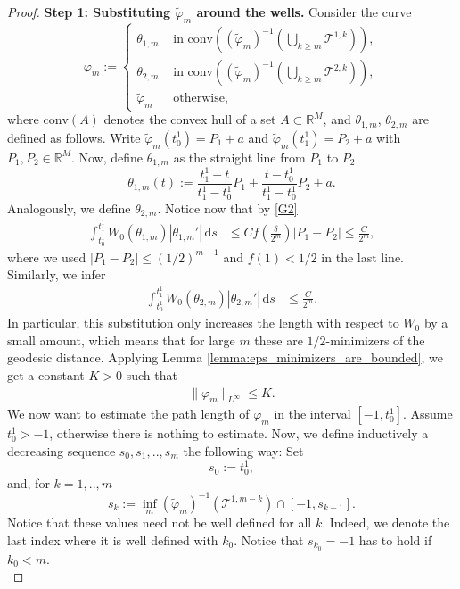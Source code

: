 \documentclass[a4paper, 11pt, reqno]{amsart}
\theoremstyle{plain}
\theoremstyle{definition}
\theoremstyle{remark}
\newcommand{\R}{\mathbb R}
\newcommand{\T}{\mathcal T}
\begin{document}
\begin{proof}
    \textbf{Step 1: Substituting $\tilde \varphi_m$ around the wells.} Consider the curve 
    \[
        \varphi_m := \begin{cases}
            \theta_{1,m} & \text{ in } \text{conv}\left((\tilde \varphi_m)^{-1}(\bigcup_{k \geq m}\T^{1,k})\right), \\
            \theta_{2,m} & \text{ in } \text{conv}\left((\tilde \varphi_m)^{-1}(\bigcup_{k \geq m}\T^{2,k})\right), \\
            \tilde \varphi_m & \text{ otherwise},
        \end{cases}
    \]
    where $\text{conv}(A)$ denotes the convex hull of a set $A \subset \R^M$, and $\theta_{1,m}$, $\theta_{2,m}$ are defined as follows.
    Write $\tilde \varphi_m(t_0^1) = P_1 + a$ and $\tilde \varphi_m(t_1^1) = P_2 + a$ with $P_1, P_2 \in \R^M$. Now, define $\theta_{1,m}$ as the straight line from $P_1$ to $P_2$
    \[
        \theta_{1,m}(t) := \frac{t_1^1 - t}{t_1^1 - t_0^1}P_1 + \frac{t - t_0^1}{t_1^1 - t_0^1}P_2 + a.
    \]
    Analogously, we define $\theta_{2,m}$.
    Notice now that by \ref{G2}
    \begin{align*}
        \int_{t_0^1}^{t_1^1} {W_0(\theta_{1,m})}|\theta_{1,m}'| \,\mathrm{d}s &\leq Cf\left( \frac{\delta}{2^m} \right)|P_1 - P_2|
        \leq \frac{C}{2^m},
    \end{align*}
    where we used $|P_1 - P_2| \leq (1/2)^{m-1}$ and $f(1) < 1/2$ in the last line. Similarly, we infer 
    \begin{align*}
        \int_{t_0^1}^{t_1^1} {W_0(\theta_{2,m})}|\theta_{2,m}'| \,\mathrm{d}s &\leq \frac{C}{2^m}.
    \end{align*}
    In particular, this substitution only increases the length with respect to $W_0$ by a small amount, which means that for large $m$ these are $1/2$-minimizers of the geodesic distance. Applying Lemma \ref{lemma:eps_minimizers_are_bounded}, we get a constant $K > 0$  such that 
    \begin{align}\label{eq:uniform_estimate_sequence}
        \|\varphi_m\|_{L^\infty} \leq K.
    \end{align}
    We now want to estimate the path length of $\varphi_m$ in the interval $[-1, t^1_0]$. Assume $t^1_0 > -1$, otherwise there is nothing to estimate. Now, we define inductively a decreasing sequence $s_0, s_1, .., s_{m}$ the following way: Set
    \[
        s_0 := t^1_0,
    \]
    and, for $k = 1, .., m$
    \[
        s_{k} := 
            \inf_m (\tilde \varphi_m)^{-1}(\T^{1, m - k}) \cap [-1, s_{k - 1}].
    \]
    Notice that these values need not be well defined for all $k$. Indeed, we denote the last index where it is well defined with $k_0$. Notice that $s_{k_0} = -1$ has to hold if $k_0 < m$. \\[-0.5em]
    

\end{proof}
\end{document}
